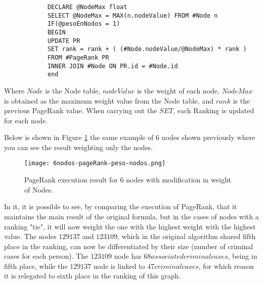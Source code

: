 \begin{scriptsize}{1}
	\tiny{
		\begin{verbatim}
			DECLARE @NodeMax float
			SELECT @NodeMax = MAX(n.nodeValue) FROM #Node n			
			IF(@pesoEnNodos = 1)
			BEGIN
			UPDATE PR 
			SET rank = rank + ( (#Node.nodeValue/@NodeMax) * rank )
			FROM #PageRank PR
			INNER JOIN #Node ON PR.id = #Node.id
			end
		\end{verbatim}
	}
\end{scriptsize}

Where $Node$ is the Node table, $nodeValue$ is the weight of each node, $NodeMax$ is obtained as the maximum weight value from the Node table, and $rank$ is the previous PageRank value. When carrying out the $SET$, each Ranking is updated for each node.

Below is shown in Figure \ref{fig:6nodos-pageRank-peso-nodos} the same example of 6 nodes shown previously where you can see the result weighting only the nodes.

\begin{figure}
	\centering
	\texttt{[image: 6nodos-pageRank-peso-nodos.png]}
	\caption{PageRank execution result for 6 nodes with modification in weight of Nodes.} 
	\label{fig:6nodos-pageRank-peso-nodos}
\end{figure}

In it, it is possible to see, by comparing the execution of PageRank, that it maintains the main result of the original formula, but in the cases of nodes with a ranking "tie", it will now weight the one with the highest weight with the highest value. The nodes $129137$ and $123109$, which in the original algorithm shared fifth place in the ranking, can now be differentiated by their size (number of criminal cases for each person). The $123109$ node has $68 associated criminal cases$, being in fifth place, while the $129137$ node is linked to $47 criminal cases$, for which reason it is relegated to sixth place in the ranking of this graph.

